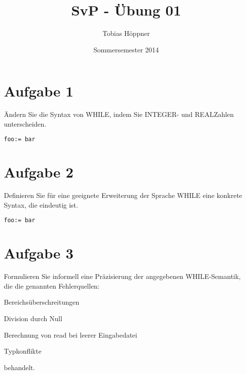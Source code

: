 \documentclass[ngerman,a4paper]{report}
\author{Tobias Höppner}
\title{SvP - Übung 01}
\date{Sommersemester 2014}
\renewcommand{\maketitle}{}
\begin{document}
 
\maketitle 
\section*{Aufgabe 1}
Ändern Sie die Syntax von WHILE, indem Sie INTEGER- und REALZahlen unterscheiden.
\begin{lstlisting}
foo:= bar
\end{lstlisting}
\section*{Aufgabe 2}
Definieren Sie für eine geeignete Erweiterung der Sprache WHILE eine konkrete Syntax, die eindeutig ist.
\begin{lstlisting}
foo:= bar
\end{lstlisting}
\section*{Aufgabe 3}
Formulieren Sie informell eine Präzisierung der angegebenen WHILE-Semantik, die die genannten Fehlerquellen:
\begin{compactenum}
\item Bereichsüberschreitungen
\item Division durch Null
\item Berechnung von read bei leerer Eingabedatei
\item Typkonflikte
\end{compactenum}
behandelt.
\end{document}
